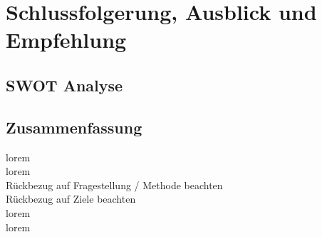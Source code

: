 \section{Schlussfolgerung, Ausblick und Empfehlung}
\subsection{SWOT Analyse}

\subsection{Zusammenfassung}
lorem\\

lorem\\

Rückbezug auf Fragestellung / Methode beachten\\

Rückbezug  auf Ziele beachten\\

lorem\\

lorem\\

